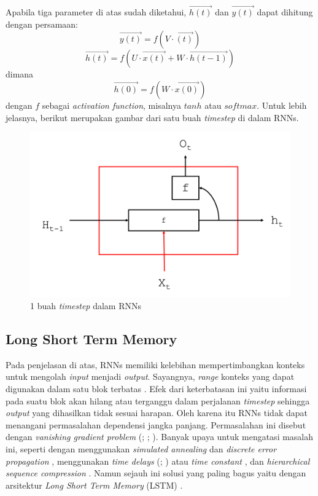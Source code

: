 Apabila tiga parameter di atas sudah diketahui, $ \vec{h(t)} $ dan $ \vec{y(t)} $ dapat dihitung dengan persamaan:
\begin{equation}
\vec{y(t)} = f(V \cdot \vec{(t)})
\end{equation}
\begin{equation}
\vec{h(t)} = f(U \cdot \vec{x(t)} + W \cdot \vec{h(t-1)})
\end{equation}
dimana
\begin{equation}
\vec{h(0)} = f(W \cdot \vec{x(0)})
\end{equation}
dengan $ f $ sebagai \textit{activation function}, misalnya $ tanh $ atau $ softmax $. Untuk lebih jelasnya, berikut merupakan gambar dari satu buah \textit{timestep} di dalam RNNs.
\begin{figure}
	\centering
	\includegraphics[width=0.80\linewidth]{images/nodes_rnn}
	\caption{1 buah \textit{timestep} dalam RNNs}
	\label{fig:nodes_rnn}
\end{figure}

\subsection{Long Short Term Memory}\label{subbab:lstm}
Pada penjelasan di atas, RNNs memiliki kelebihan mempertimbangkan konteks untuk mengolah \textit{input} menjadi \textit{output}. Sayangnya, \textit{range} konteks yang dapat digunakan dalam satu blok terbatas \citep{graves2012neural}. Efek dari keterbatasan ini yaitu informasi pada suatu blok akan hilang atau terganggu dalam perjalanan \textit{timestep} sehingga \textit{output} yang dihasilkan tidak sesuai harapan. Oleh karena itu RNNs tidak dapat menangani permasalahan dependensi jangka panjang. Permasalahan ini disebut dengan \textit{vanishing gradient problem} (\cite{hochreiter1991untersuchungen}; \cite{hochreiter2001gradient}; \cite{bengio1994learning}). Banyak upaya untuk mengatasi masalah ini, seperti dengan menggunakan \textit{simulated annealing} dan \textit{discrete error propagation} \citep{bengio1994learning}, menggunakan \textit{time delays} (\cite{lang1990time}; \cite{bakker2001reinforcement}) atau \textit{time constant} \citep{ieee1997advances}, dan \textit{hierarchical sequence compression} \citep{schmidhuber2007training}. Namun sejauh ini solusi yang paling bagus yaitu dengan arsitektur \textit{Long Short Term Memory} (LSTM) \citep{hochreiter1997long}.

